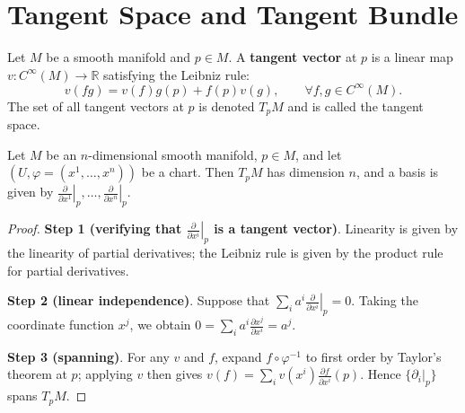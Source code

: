 \section{Tangent Space and Tangent Bundle}

\begin{definition}\label{def:tangent_vector_derivation}
Let $M$ be a smooth manifold and $p \in M$. A \textbf{tangent vector} at $p$ is a linear map $v: C^\infty(M) \to \mathbb{R}$ satisfying the Leibniz rule:
\[
v(fg) = v(f) g(p) + f(p) v(g), \qquad \forall f, g \in C^\infty(M).
\]
The set of all tangent vectors at $p$ is denoted $T_pM$ and is called the tangent space.
\end{definition}

\begin{proposition}\label{prop:tangent_space_basis}
Let $M$ be an $n$-dimensional smooth manifold, $p \in M$, and let $(U, \varphi = (x^1, \dots, x^n))$ be a chart. Then $T_pM$ has dimension $n$, and a basis is given by $\left. \frac{\partial}{\partial x^1} \right|_p, \dots, \left. \frac{\partial}{\partial x^n} \right|_p$.
\end{proposition}

\begin{proof}
\textbf{Step 1 (verifying that $\left. \frac{\partial}{\partial x^i} \right|_p$ is a tangent vector)}. Linearity is given by the linearity of partial derivatives; the Leibniz rule is given by the product rule for partial derivatives.

\textbf{Step 2 (linear independence)}. Suppose that $\sum_i a^i \left. \frac{\partial}{\partial x^i} \right|_p = 0$. Taking the coordinate function $x^j$, we obtain $0 = \sum_i a^i \frac{\partial x^j}{\partial x^i} = a^j$.

\textbf{Step 3 (spanning)}. For any $v$ and $f$, expand $f \circ \varphi^{-1}$ to first order by Taylor's theorem at $p$; applying $v$ then gives $v(f) = \sum_i v(x^i) \frac{\partial f}{\partial x^i}(p)$. Hence $\{ \partial_i|_p \}$ spans $T_pM$.
\end{proof}

